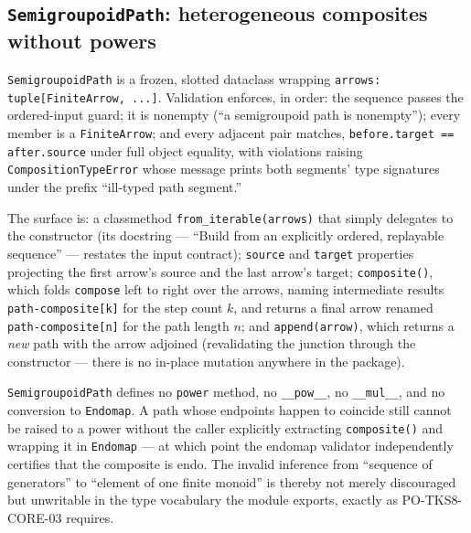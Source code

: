 \subsection{\texttt{SemigroupoidPath}: heterogeneous composites without powers}\label{ch09:sec:path}

\begin{construction}\label{ch09:con:path}
\texttt{SemigroupoidPath} is a frozen, slotted dataclass wrapping
\texttt{arrows: tuple[FiniteArrow, ...]}. Validation enforces, in order:
the sequence passes the ordered-input guard; it is nonempty (``a
semigroupoid path is nonempty''); every member is a \texttt{FiniteArrow};
and every adjacent pair matches, \texttt{before.target == after.source}
under full object equality, with violations raising
\texttt{CompositionTypeError} whose message prints both segments' type
signatures under the prefix ``ill-typed path segment.''
\end{construction}

The surface is: a classmethod \texttt{from\_iterable(arrows)} that simply
delegates to the constructor (its docstring --- ``Build from an explicitly
ordered, replayable sequence'' --- restates the input contract);
\texttt{source} and \texttt{target} properties projecting the first arrow's
source and the last arrow's target; \texttt{composite()}, which folds
\texttt{compose} left to right over the arrows, naming intermediate results
\texttt{path-composite[k]} for the step count $k$, and returns a final
arrow renamed \texttt{path-composite[n]} for the path length $n$; and
\texttt{append(arrow)}, which returns a \emph{new} path with the arrow
adjoined (revalidating the junction through the constructor --- there is no
in-place mutation anywhere in the package).

\begin{invariant}\label{ch09:inv:no-path-power}
\texttt{SemigroupoidPath} defines no \texttt{power} method, no
\texttt{\_\_pow\_\_}, no \texttt{\_\_mul\_\_}, and no conversion to
\texttt{Endomap}. A path whose endpoints happen to coincide still cannot be
raised to a power without the caller explicitly extracting
\texttt{composite()} and wrapping it in \texttt{Endomap} --- at which point
the endomap validator independently certifies that the composite is endo.
The invalid inference from ``sequence of generators'' to ``element of one
finite monoid'' is thereby not merely discouraged but unwritable in the
type vocabulary the module exports, exactly as PO-TKS8-CORE-03 requires.
\end{invariant}

